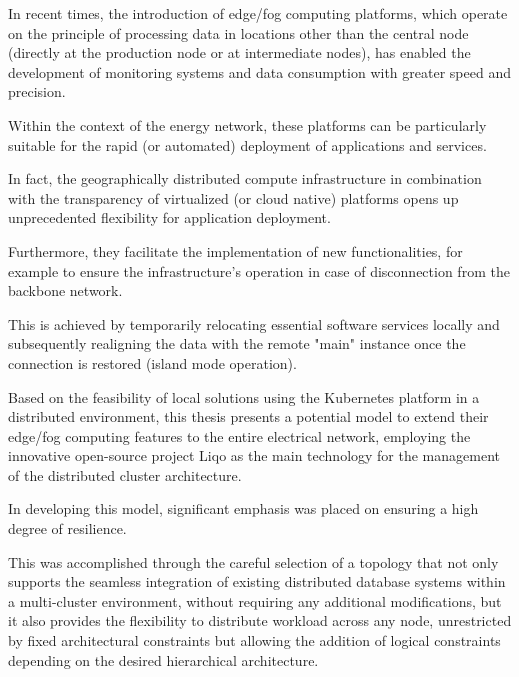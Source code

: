 \documentclass[%
	corpo=11pt,
    twoside,
    stile=classica,
    oldstyle,
    tipotesi=custom,
    greek,
    evenboxes,
]{toptesi}
\begin{document}
\english




\sommario%
In recent times, the introduction of edge/fog computing platforms, which operate on the principle of processing data in locations other than the central node (directly at the production node or at intermediate nodes), has enabled the development of monitoring systems and data consumption with greater speed and precision.

Within the context of the energy network, these platforms can be particularly suitable for the rapid (or automated) deployment of applications and services.

In fact, the geographically distributed compute infrastructure in combination with the transparency of virtualized (or cloud native) platforms opens up unprecedented flexibility for application deployment. 

Furthermore, they facilitate the implementation of new functionalities, for example to ensure the infrastructure's operation in case of disconnection from the backbone network. 

This is achieved by temporarily relocating essential software services locally and subsequently realigning the data with the remote "main" instance once the connection is restored (island mode operation). 

Based on the feasibility of local solutions using the Kubernetes platform in a distributed environment, this thesis presents a potential model to extend their edge/fog computing features to the entire electrical network, employing the innovative open-source project Liqo as the main technology for the management of the distributed cluster architecture.

In developing this model, significant emphasis was placed on ensuring a high degree of resilience. 

This was accomplished through the careful selection of a topology that not only supports the seamless integration of existing distributed database systems within a multi-cluster environment, without requiring any additional modifications, but it also provides the flexibility to distribute workload across any node, unrestricted by fixed architectural constraints but allowing the addition of logical constraints depending on the desired hierarchical architecture.
\end{document}
